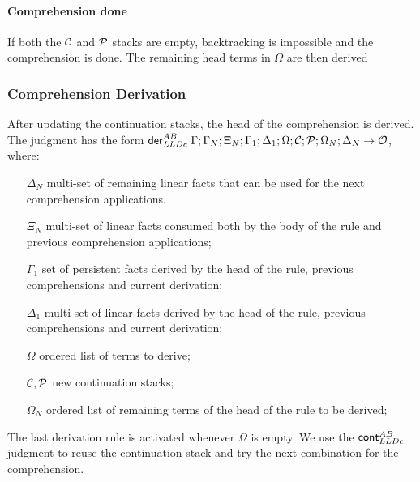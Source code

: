 

\paragraph{Comprehension done}

If both the $\mathcal{C}$ and $\mathcal{P}$ stacks are empty, backtracking is impossible and the
comprehension is done. The remaining head terms in $\Omega$ are then derived



\subsubsection{Comprehension Derivation}

After updating the continuation stacks, the head of the comprehension is
derived. The judgment has the form $\mathsf{der}_{LLDc}^{AB} \; \Gamma; \Gamma_N; \Xi_N; \Gamma_1; \Delta_1;
\Omega; \mathcal{C}; \mathcal{P}; \Omega_N; \Delta_N \rightarrow \mathcal{O}$, where:

\begin{enumerate}
   \item[$\Delta_N$] multi-set of remaining linear facts that can be used for
   the next comprehension applications.
   \item[$\Xi_N$] multi-set of linear facts consumed both by the body of the rule
   and previous comprehension applications;
   \item[$\Gamma_1$] set of persistent facts derived by the head of the rule,
   previous comprehensions and current derivation;
   \item[$\Delta_1$] multi-set of linear facts derived by the head of the rule,
   previous comprehensions and current derivation;
   \item[$\Omega$] ordered list of terms to derive;
   \item[$\mathcal{C}, \mathcal{P}$] new continuation stacks;
   \item[$\Omega_N$] ordered list of remaining terms of the head of the rule to
   be derived;
\end{enumerate}



The last derivation rule is activated whenever $\Omega$ is empty. We use the
$\mathsf{cont}_{LLDc}^{AB} \;$judgment to reuse the continuation stack
and try the next combination for the comprehension.


